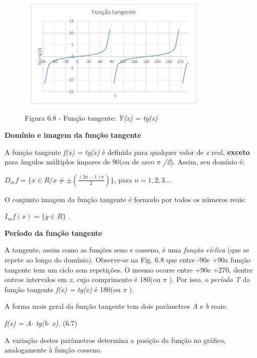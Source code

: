 \begin{figure}[H]
    \begin{Center}
        \includegraphics[width=3.69in,height=2.07in]{capitulos/trigonometria_e_funcoes_trigonometricas/media/image37.png}

        Figura 6.8 - Função tangente: \textit{Y(x) = tg(x)}
    \end{Center}
\end{figure}

\textbf{Domínio e imagem da função tangente}

A função tangente \textit{f(x) = tg(x) }é definida para qualquer valor de \textit{x} real, \textbf{exceto} para ângulos múltiplos ímpares de 90\degree  (ou de arco \textit{$ \pi $ /2}). Assim, seu domínio é:

$D_{m}f = \{x \in R / x \neq \pm (\frac{(2n-1)\pi}{2})\}$, para $n=1,2,3...$

O conjunto imagem da função tangente é formado por todos os números reais:

  \( I_{m}f \left( x \right) = \{ y \in  R \}  \) .

\textbf{Período da função tangente}

A tangente, assim como as funções seno e cosseno, é uma \textit{função cíclica} (que se repete ao longo do domínio). Observe-se na Fig. 6.8 que entre -90\degree  e +90\degree a função tangente tem um ciclo sem repetições. O mesmo ocorre entre +90\degree e +270\degree, dentre outros intervalos em \textit{x}, cujo comprimento é 180\degree (ou  $ \pi $ ). Por isso, o \textit{período T} da função tangente  \textit{f(x) = tg(x) } é 180\degree (ou  $ \pi $ ).

A forma mais geral da função tangente tem dois parâmetros \textit{A }e\textit{ b} reais:

\textit{f(x) = A$ \cdot $ tg(b$ \cdot $ x).  \tab \tab \tab \tab \tab   }(6.7)

A variação destes parâmetros determina a posição da função no gráfico, analogamente à função cosseno.

